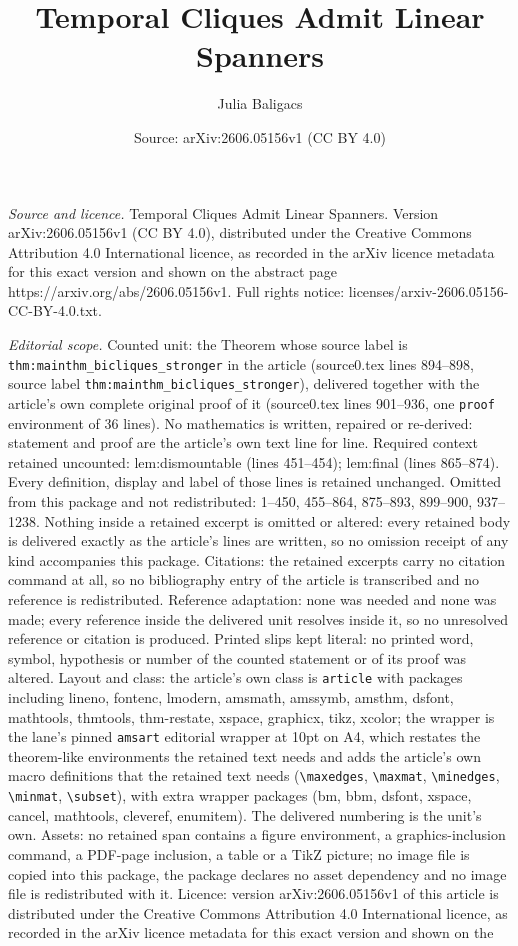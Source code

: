 \documentclass[10pt,a4paper]{amsart}
\title[Temporal Cliques Admit Linear Spanners]{Temporal Cliques Admit Linear Spanners}
\author{Julia Baligacs}
\date{Source: arXiv:2606.05156v1 (CC BY 4.0)}
\begin{document}
\maketitle

\noindent\emph{Source and licence.} Temporal Cliques Admit Linear Spanners. Version arXiv:2606.05156v1 (CC BY 4.0), distributed under the Creative Commons Attribution 4.0 International licence, as recorded in the arXiv licence metadata for this exact version and shown on the abstract page https://arxiv.org/abs/2606.05156v1. Full rights notice: licenses/arxiv-2606.05156-CC-BY-4.0.txt.\par\smallskip

\noindent\textit{Editorial scope.} Counted unit: the Theorem whose source label is \texttt{thm:mainthm\_bicliques\_stronger} in the article (source0.tex lines 894--898, source label \texttt{thm:mainthm\_bicliques\_stronger}), delivered together with the article's own complete original proof of it (source0.tex lines 901--936, one \texttt{proof} environment of 36 lines). No mathematics is written, repaired or re-derived: statement and proof are the article's own text line for line. Required context retained uncounted: lem:dismountable (lines 451--454); lem:final (lines 865--874). Every definition, display and label of those lines is retained unchanged. Omitted from this package and not redistributed: 1--450, 455--864, 875--893, 899--900, 937--1238. Nothing inside a retained excerpt is omitted or altered: every retained body is delivered exactly as the article's lines are written, so no omission receipt of any kind accompanies this package. Citations: the retained excerpts carry no citation command at all, so no bibliography entry of the article is transcribed and no reference is redistributed. Reference adaptation: none was needed and none was made; every reference inside the delivered unit resolves inside it, so no unresolved reference or citation is produced. Printed slips kept literal: no printed word, symbol, hypothesis or number of the counted statement or of its proof was altered. Layout and class: the article's own class is \texttt{article} with packages including lineno, fontenc, lmodern, amsmath, amssymb, amsthm, dsfont, mathtools, thmtools, thm-restate, xspace, graphicx, tikz, xcolor; the wrapper is the lane's pinned \texttt{amsart} editorial wrapper at 10pt on A4, which restates the theorem-like environments the retained text needs and adds the article's own macro definitions that the retained text needs (\texttt{\textbackslash maxedges}, \texttt{\textbackslash maxmat}, \texttt{\textbackslash minedges}, \texttt{\textbackslash minmat}, \texttt{\textbackslash subset}), with extra wrapper packages (bm, bbm, dsfont, xspace, cancel, mathtools, cleveref, enumitem). The delivered numbering is the unit's own. Assets: no retained span contains a figure environment, a graphics-inclusion command, a PDF-page inclusion, a table or a TikZ picture; no image file is copied into this package, the package declares no asset dependency and no image file is redistributed with it. Licence: version arXiv:2606.05156v1 of this article is distributed under the Creative Commons Attribution 4.0 International licence, as recorded in the arXiv licence metadata for this exact version and shown on the 
\end{document}
